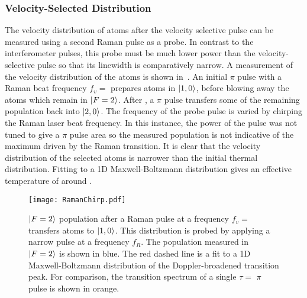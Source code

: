 \subsubsection{Velocity-Selected Distribution}
The velocity distribution of atoms after the velocity selective pulse
can be measured using a second Raman pulse as a probe. In contrast to
the interferometer pulses, this probe must be much lower power than
the velocity-selective pulse so that its linewidth is comparatively narrow.
A measurement of the velocity distribution of the atoms is shown
in~. An initial
 \(\pi\) pulse with a Raman beat frequency
\(f_v = \)  prepares atoms in
\(\ket{1,0}\), before blowing away the atoms which remain in
\(\ket{F=2}\). After , a
 \(\pi\) pulse transfers some of the
remaining population back into \(\ket{2,0}\). The frequency of the
probe pulse is varied by chirping the Raman laser beat frequency. In
this instance, the power of the pulse was not tuned to give a \(\pi\)
pulse area so the measured population is not indicative of the maximum
driven by the Raman transition. It is clear that the velocity
distribution of the selected atoms is narrower than the initial
thermal distribution. Fitting to a 1D Maxwell-Boltzmann distribution
gives an effective temperature of around .
\begin{figure}[htpb!]
  \centering
  \texttt{[image: RamanChirp.pdf]}
  \caption[$\ket{F=2}$ population after a velocity-selective Raman
  $\pi$ pulse.]{\(\ket{F=2}\) population after a Raman pulse at a frequency
    \(f_v =\) transfers atoms to
    \(\ket{1,0}\). This distribution is probed by
  applying a narrow pulse at a frequency \(f_{R}\). The population
measured in \(\ket{F=2}\) is shown in blue. The red dashed line is a
fit to a 1D Maxwell-Boltzmann distribution of the Doppler-broadened
transition peak. For comparison, the
transition spectrum of a single \(\tau = \) \(\pi\)
pulse is shown in orange.}
  \label{fig:vel_select_chirp}
\end{figure}
